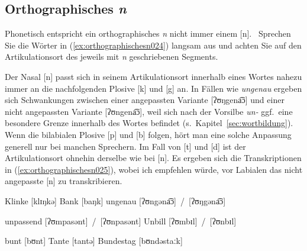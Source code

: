 \begin{exe}
  \ex\label{ex:silbischenasaleundapproximanten023}
  \begin{xlist}
  \end{xlist}
\end{exe}

\subsection{Orthographisches \textit{n}}
\label{sec:orthographischesn}

Phonetisch entspricht ein orthographisches \textit{n} nicht immer einem [n].
\TuBegin~Sprechen Sie die Wörter in (\ref{ex:orthographischesn024}) langsam aus und achten Sie auf den Artikulationsort des jeweils mit \textit{n} geschriebenen Segments.

\begin{exe}
  \ex\label{ex:orthographischesn024}
  \begin{xlist}
  \end{xlist}
\end{exe}

Der Nasal [n] passt sich in seinem Artikulationsort innerhalb eines Wortes nahezu immer an die nachfolgenden Plosive [k] und [g] an.
In Fällen wie \textit{ungenau} ergeben sich Schwankungen zwischen einer angepassten Variante [ʔʊŋgena͡ɔ] und einer nicht angepassten Variante [ʔʊngena͡ɔ], weil sich nach der Vorsilbe \textit{un-} ggf.\ eine besondere Grenze innerhalb des Wortes befindet (s.\ Kapitel~\ref{sec:wortbildung}).
Wenn die bilabialen Plosive [p] und [b] folgen, hört man eine solche Anpassung generell nur bei manchen Sprechern.
Im Fall von [t] und [d] ist der Artikulationsort ohnehin derselbe wie bei [n].
Es ergeben sich die Transkriptionen in (\ref{ex:orthographischesn025}), wobei ich empfehlen würde, vor Labialen das nicht angepasste [n] zu transkribieren.

\begin{exe}
    \ex\label{ex:orthographischesn025}
    \begin{xlist}
      \ex Klinke [klɪŋkə]
      \ex Bank [baŋk]
      \ex ungenau [ʔʊngəna͡ɔ]~\slash~[ʔʊŋgəna͡ɔ]
    \end{xlist}
    \ex\label{ex:orthographischesn026}
    \begin{xlist}
      \ex unpassend [ʔʊmpasənt]~\slash~[ʔʊnpasənt]
      \ex Unbill [ʔʊmbɪl]~\slash~[ʔʊnbɪl]
    \end{xlist}
    \ex\label{ex:orthographischesn027}
    \begin{xlist}
      \ex bunt [bʊnt]
      \ex Tante [tantə]
      \ex Bundestag [bʊndəstaːk]
    \end{xlist}
\end{exe}

